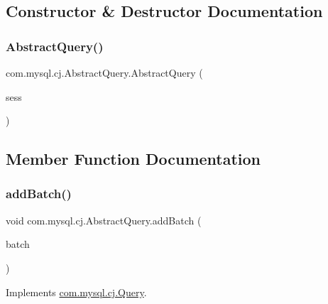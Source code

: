 \subsection{Constructor \& Destructor Documentation}
\mbox{\label{classcom_1_1mysql_1_1cj_1_1_abstract_query_a5f9037e29f17a601300b2e1d3d7958a8}} 
\subsubsection{\texorpdfstring{Abstract\+Query()}{AbstractQuery()}}
{\footnotesize\ttfamily com.\+mysql.\+cj.\+Abstract\+Query.\+Abstract\+Query (\begin{DoxyParamCaption}\item[{\mbox{\hyperlink{classcom_1_1mysql_1_1cj_1_1_native_session}{Native\+Session}}}]{sess }\end{DoxyParamCaption})}



\subsection{Member Function Documentation}
\mbox{\label{classcom_1_1mysql_1_1cj_1_1_abstract_query_ac2dda664631f654d91ec3e0f5a53a4dd}} 
\subsubsection{\texorpdfstring{add\+Batch()}{addBatch()}}
{\footnotesize\ttfamily void com.\+mysql.\+cj.\+Abstract\+Query.\+add\+Batch (\begin{DoxyParamCaption}\item[{Object}]{batch }\end{DoxyParamCaption})}



Implements \mbox{\hyperlink{interfacecom_1_1mysql_1_1cj_1_1_query_a726941dcc741acae509b16f14730966a}{com.\+mysql.\+cj.\+Query}}.

